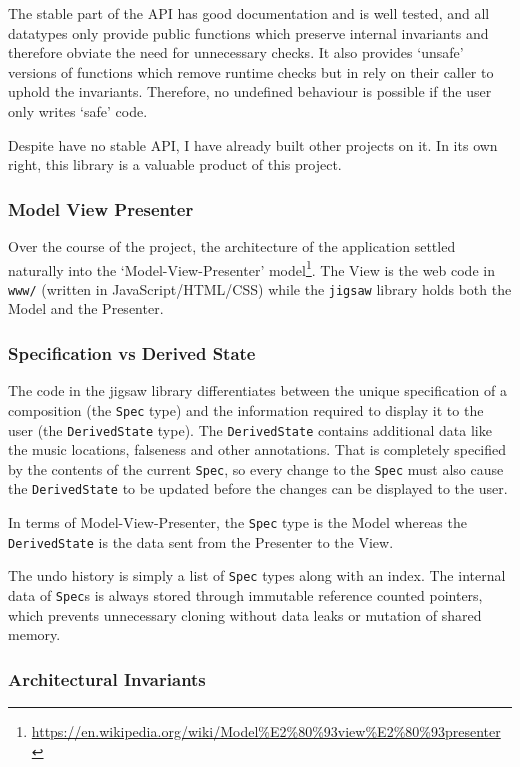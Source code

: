\documentclass[12pt]{article}
\newcommand{\footurl}[1]{\footnote{\url{#1}}}
\begin{document}
The stable part of the API has good documentation and is well tested, and all datatypes only provide
public functions which preserve internal invariants and therefore obviate the need for unnecessary
checks.  It also provides `unsafe' versions of functions which remove runtime checks but in rely on
their caller to uphold the invariants.  Therefore, no undefined behaviour is possible if the user
only writes `safe' code.

Despite have no stable API, I have already built other projects on it.  In its own right, this
library is a valuable product of this project.

\subsubsection{Model View Presenter}

Over the course of the project, the architecture of the application settled naturally into the
`Model-View-Presenter'
model\footurl{https://en.wikipedia.org/wiki/Model\%E2\%80\%93view\%E2\%80\%93presenter}.  The View
is the web code in \verb|www/| (written in JavaScript/HTML/CSS) while the \verb|jigsaw| library
holds both the Model and the Presenter.

\subsubsection{Specification vs Derived State}

The code in the jigsaw library differentiates between the unique specification of a composition
(the \verb|Spec| type) and the information required to display it to the user (the
\verb|DerivedState| type).  The \verb|DerivedState| contains additional data like the music
locations, falseness and other annotations.  That is completely specified by the contents of the
current \verb|Spec|, so every change to the \verb|Spec| must also cause the \verb|DerivedState| to
be updated before the changes can be displayed to the user.

In terms of Model-View-Presenter, the \verb|Spec| type is the Model whereas the \verb|DerivedState|
is the data sent from the Presenter to the View.

The undo history is simply a list of \verb|Spec| types along with an index.  The internal data of
\verb|Spec|s is always stored through immutable reference counted pointers, which prevents
unnecessary cloning without data leaks or mutation of shared memory.

\subsubsection{Architectural Invariants}
\end{document}
